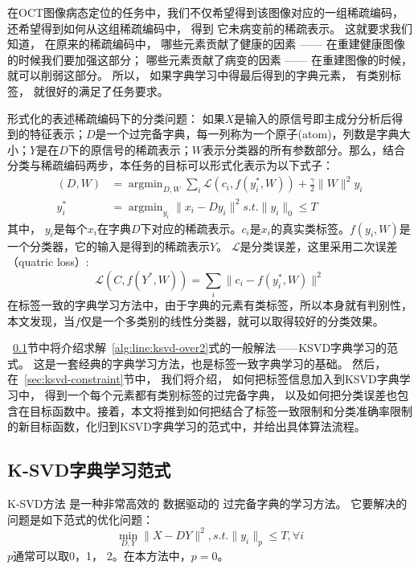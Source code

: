     在OCT图像病态定位的任务中，我们不仅希望得到该图像对应的一组稀疏编码， 还希望得到如何从这组稀疏编码中， 得到 它未病变前的稀疏表示。 这就要求我们 知道， 在原来的稀疏编码中， 哪些元素贡献了健康的因素 —— 在重建健康图像的时候我们要加强这部分； 哪些元素贡献了病变的因素 —— 在重建图像的时候， 就可以削弱这部分。  所以， 如果字典学习中得最后得到的字典元素， 有类别标签\cite{jiang2013label}， 就很好的满足了任务要求。

    形式化的表述稀疏编码下的分类问题：    
    如果$X$是输入的原信号即主成分分析后得到的特征表示；$D$是一个过完备字典，每一列称为一个原子(atom)，列数是字典大小；$Y$是在$D$下的原信号的稀疏表示；$W$表示分类器的所有参数部分。那么，结合分类与稀疏编码两步，本任务的目标可以形式化表示为以下式子：
    \begin{align}
        (D, W) & = \mathop{\arg \min}_{D, W} \sum_i \mathcal{L} (c_i, f(y_i^*, W)) + \frac{\gamma}{2}\|W\| ^2
        y_i \\
        y_i^* & = \mathop{\arg \min}_{y_i} \|x_i - Dy_i\| ^2 s.t. \|y_i\|_0 \le T \label{alg:line:ksvd-over2}
    \end{align}
    其中， $y_i$是每个$x_i$在字典$D$下对应的稀疏表示。$c_i$是$x_i$的真实类标签。$f(y_i, W)$是一个分类器，它的输入是得到的稀疏表示$Y$。 $\mathcal{L}$是分类误差，这里采用二次误差（quatric loss）:
    \begin{equation}
        \mathcal{L}(C, f(Y^*, W)) = \sum _i \|c_i - f(y_i^* , W) \| ^2 
    \end{equation}
    在标签一致的字典学习方法中，由于字典的元素有类标签，所以本身就有判别性，本文发现，当$f$仅是一个多类别的线性分类器，就可以取得较好的分类效果。

    ~\ref{sec:lsvd-lasso}节中将介绍求解~\ref{alg:line:ksvd-over2}式的一般解法——KSVD字典学习的范式。 这是一套经典的字典学习方法，也是标签一致字典学习的基础。 然后， 在~\ref{sec:ksvd-constraint}节中，  我们将介绍， 如何把标签信息加入到KSVD字典学习中，  得到一个每个元素都有类别标签的过完备字典\cite{jiang2013label}， 以及如何把分类误差也包含在目标函数中。接着，本文将推到如何把结合了标签一致限制和分类准确率限制的新目标函数，化归到KSVD字典学习的范式中，并给出具体算法流程。


    \subsection{K-SVD字典学习范式} 
    \label{sec:lsvd-lasso}
    K-SVD方法 \cite{aharon2006rm}是一种非常高效的 数据驱动的 过完备字典的学习方法。  它要解决的问题是如下范式的优化问题：
    \begin{equation}
    \label{alg:ksvd-lasso}
        \min _{D, Y} \| X - DY \| ^2 , s.t. \| y_i \| _p \le T, \forall i
    \end{equation}
    $p$通常可以取0，1， 2。在本方法中，$p = 0$。

